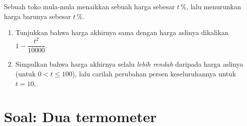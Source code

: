 \begin{exercise}[$\star\star\star$]\label{exo:g9:linfunc:10}
Sebuah toko mula-mula menaikkan sebuah harga sebesar $t\,\%$, lalu
menurunkan harga barunya sebesar $t\,\%$.
\begin{enumerate}
  \item Tunjukkan bahwa harga akhirnya sama dengan harga aslinya
        dikalikan $1 - \dfrac{t^2}{10000}$.
  \item Simpulkan bahwa harga akhirnya selalu \emph{lebih rendah}
        daripada harga aslinya (untuk $0 < t \leq 100$), lalu carilah
        perubahan persen keseluruhannya untuk $t = 10$.
\end{enumerate}
\end{exercise}

\section{Soal: Dua termometer}

